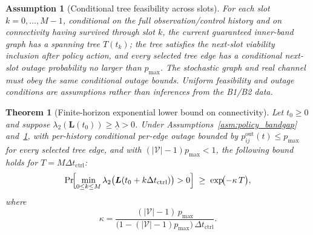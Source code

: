 \documentclass[preprint,12pt]{elsarticle}
\theoremstyle{definition}\newtheorem{definition}{Definition}
\theoremstyle{plain}\newtheorem{theorem}{Theorem}
\theoremstyle{plain}\newtheorem{lemma}{Lemma}
\theoremstyle{plain}\newtheorem{corollary}{Corollary}
\theoremstyle{plain}\newtheorem{assumption}{Assumption}
\theoremstyle{remark}\newtheorem{remark}[theorem]{Remark}
\begin{document}
\begin{assumption}[Conditional tree feasibility across slots]
\label{asm:conditional_tree_feasible}
For each slot $k=0,\ldots,M-1$, conditional on the full observation/control history and on connectivity having survived through slot $k$, the current guaranteed inner-band graph has a spanning tree $T(t_k)$; the tree satisfies the next-slot viability inclusion after policy action, and every selected tree edge has a conditional next-slot outage probability no larger than $p_{\max}$. The stochastic graph and real channel must obey the same conditional outage bounds. Uniform feasibility and outage conditions are assumptions rather than inferences from the B1/B2 data.
\end{assumption}

\begin{theorem}[Finite-horizon exponential lower bound on connectivity]
\label{thm:conn}
Let $t_0\ge 0$ and suppose $\lambda_2(\boldsymbol L(t_0))\ge \underline{\lambda}>0$. 
Under Assumptions~\ref{asm:policy_bandgap} and~\ref{asm:conditional_tree_feasible},
with per-history conditional per-edge outage bounded by $p^{\mathrm{out}}_{ij}(t)\le p_{\max}$ for every selected tree edge,
and with $(|\mathcal{V}|-1)p_{\max}<1$, the following bound holds for $T=M\Delta t_{\text{ctrl}}$:
\[
  \Pr\!\Bigl[\min_{0\le k\le M}\lambda_2\bigl(\boldsymbol L(t_0+k\Delta t_{\text{ctrl}})\bigr)>0\Bigr]
  \;\ge\; \exp\!\bigl(-\kappa\,T\bigr),
\]
where
\[
  \kappa = \frac{(|\mathcal{V}|-1)\,p_{\max}}{\bigl(1-(|\mathcal{V}|-1)p_{\max}\bigr)\,\Delta t_{\text{ctrl}}}.
\]
\end{theorem}
\end{document}
